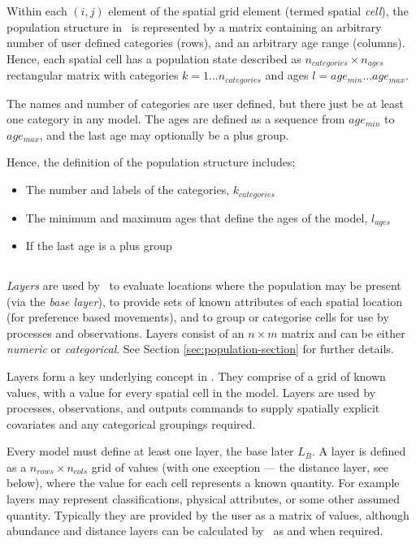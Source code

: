 Within each $(i,j)$ element of the spatial grid element (termed spatial \emph{cell}), the population structure in \SPM\ is represented by a matrix containing an arbitrary number of user defined categories (rows), and an arbitrary age range (columns). Hence, each spatial cell has a population state described as $n_{categories} \times n_{ages}$ rectangular matrix with categories $k=1 \ldots n_{categories}$ and ages $l=age_{min} \ldots age_{max}$. 

The names and number of categories are user defined, but there  just be at least one category in any model. The ages are defined as a sequence from $age_{min}$ to $age_{max}$, and the last age may optionally be a plus group.

Hence, the definition of the population structure includes;
\begin{itemize}
  \item The number and labels of the categories, $k_{categories}$
  \item The minimum and maximum ages that define the ages of the model, $l_{ages}$
  \item If the last age is a plus group
\end{itemize}

\subsection{\label{sec:layers}}

\emph{Layers} are used by \SPM\ to evaluate locations where the population may be present (via the \emph{base layer}), to provide sets of known attributes of each spatial location (for preference based movements), and to group or categorise cells for use by processes and observations. Layers consist of an $n \times m$ matrix and can be either \emph{numeric} or \emph{categorical}. See Section \ref{sec:population-section} for further details.

Layers form a key underlying concept in \SPM. They comprise of a grid of known values, with a value for every spatial cell in the model. Layers are used by processes, observations, and outputs commands to supply spatially explicit covariates and any categorical groupings required. 

Every model must define at least one layer, the base later $L_B$. A layer is defined as a $n_{rows} \times n_{cols}$ grid of values (with one exception --- the distance layer, see below), where the value for each cell represents a known quantity. For example layers may represent classifications, physical attributes, or some other assumed quantity. Typically they are provided by the user as a matrix of values, although abundance and distance layers can be calculated by \SPM\ as and when required. 

